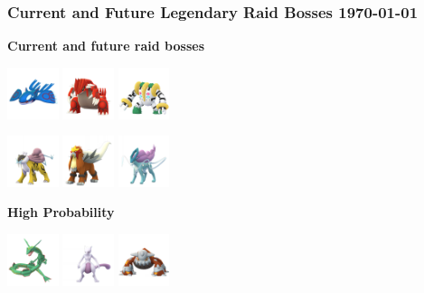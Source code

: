 \documentclass[12pt]{beamer}
\begin{document}
\begin{frame}
\frametitle{Current and Future Legendary Raid Bosses \hspace{3cm} \today}

\begin{block}{}
\begin{footnotesize}

\begin{center}
\textbf{Current and future raid bosses}

 \includegraphics[width=1.5cm]{../../images/pokemon/kyogre.png}\quad\quad
 \includegraphics[width=1.5cm]{../../images/pokemon/groudon.png}\quad\quad
 \includegraphics[width=1.5cm]{../../images/pokemon/regigigas.png}
 
 \includegraphics[width=1.5cm]{../../images/pokemon/raikou.png}\quad\quad
 \includegraphics[width=1.5cm]{../../images/pokemon/entei.png}\quad\quad
 \includegraphics[width=1.5cm]{../../images/pokemon/suicune.png}

\bigskip\bigskip

\textbf{High Probability}

 \includegraphics[width=1.5cm]{../../images/pokemon/rayquaza.png}\quad\quad
 \includegraphics[width=1.5cm]{../../images/pokemon/mewtwo.png}\quad\quad
 \includegraphics[width=1.5cm]{../../images/pokemon/heatran.png}
 

\end{center}
\end{footnotesize}
\end{block}
\end{frame}
\end{document}
